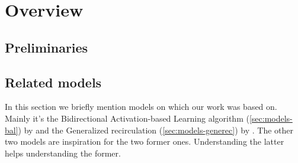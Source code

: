 



\section{Overview}
\label{sec:overview} 

\subsection{Preliminaries}
\label{sec:theory} 

 



\subsection{Related models} %
\label{sec:overview-models}  

In this section we briefly mention models on which our work was based on. Mainly it's the Bidirectional Activation-based Learning algorithm (\ref{sec:models-bal}) by \citet{farkas2013bal} and the Generalized recirculation (\ref{sec:models-generec}) by \citet{o1996bio}. The other two models are inspiration for the two former ones. Understanding the latter helps understanding the former. 










 
